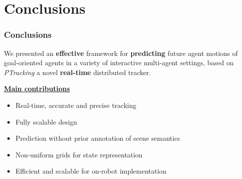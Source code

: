 \section{Conclusions}

\begin{frame}
	\frametitle{Conclusions}
	
	\Large
	
	\vspace{0.5cm}
	
	We presented an \textbf{effective} framework for \textbf{predicting} future agent motions of
	goal-oriented agents in a variety of interactive multi-agent settings, based on \emph{PTracking} a
	novel \textbf{real-time} distributed tracker.
	
	\vspace{0.3cm}
	
	\underline{\textbf{Main contributions}}
	
	\begin{itemize}
		\item Real-time, accurate and precise tracking
		\item Fully scalable design
		\item Prediction without prior annotation of scene semantics
		\item Non-uniform grids for state representation
		\item Efficient and scalable for on-robot implementation
	\end{itemize}
\end{frame}

